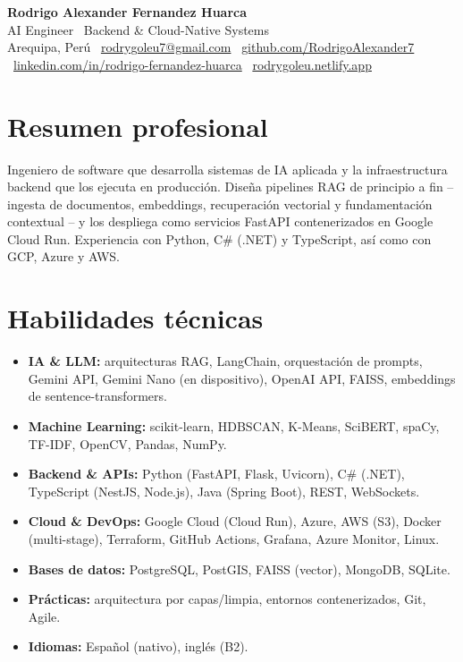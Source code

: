 \documentclass[11pt,letterpaper]{article}
\begin{document}
\begin{center}
  {\LARGE \textbf{Rodrigo Alexander Fernandez Huarca}}\\[5pt]
  {\large AI Engineer \textbar\ Backend \& Cloud-Native Systems}\\[4pt]
  Arequipa, Perú \textbar\
  \href{mailto:rodrygoleu7@gmail.com}{rodrygoleu7@gmail.com} \textbar\
  \href{https://github.com/RodrigoAlexander7}{github.com/RodrigoAlexander7} \textbar\
  \href{https://linkedin.com/in/rodrigo-fernandez-huarca}{linkedin.com/in/rodrigo-fernandez-huarca} \textbar\
  \href{https://rodrygoleu.netlify.app}{rodrygoleu.netlify.app}
\end{center}

\section{Resumen profesional}
Ingeniero de software que desarrolla sistemas de IA aplicada y la infraestructura backend que los ejecuta en producción.
Diseña pipelines RAG de principio a fin -- ingesta de documentos, embeddings, recuperación vectorial y fundamentación contextual --
y los despliega como servicios FastAPI contenerizados en Google Cloud Run. Experiencia con Python, C\# (.NET)
y TypeScript, así como con GCP, Azure y AWS.

\section{Habilidades técnicas}
\begin{itemize}
  \item \textbf{IA \& LLM:} arquitecturas RAG, LangChain, orquestación de prompts, Gemini API, Gemini Nano (en dispositivo), OpenAI API, FAISS, embeddings de sentence-transformers.
  \item \textbf{Machine Learning:} scikit-learn, HDBSCAN, K-Means, SciBERT, spaCy, TF-IDF, OpenCV, Pandas, NumPy.
  \item \textbf{Backend \& APIs:} Python (FastAPI, Flask, Uvicorn), C\# (.NET), TypeScript (NestJS, Node.js), Java (Spring Boot), REST, WebSockets.
  \item \textbf{Cloud \& DevOps:} Google Cloud (Cloud Run), Azure, AWS (S3), Docker (multi-stage), Terraform, GitHub Actions, Grafana, Azure Monitor, Linux.
  \item \textbf{Bases de datos:} PostgreSQL, PostGIS, FAISS (vector), MongoDB, SQLite.
  \item \textbf{Prácticas:} arquitectura por capas/limpia, entornos contenerizados, Git, Agile.
  \item \textbf{Idiomas:} Español (nativo), inglés (B2).
\end{itemize}
\end{document}
